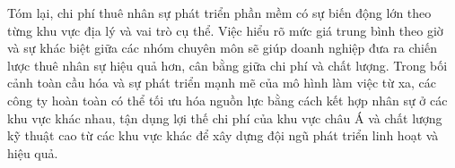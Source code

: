     
      \hspace*{0.8cm}Tóm lại, chi phí thuê nhân sự phát triển phần mềm có sự biến động lớn theo từng khu vực địa lý và vai trò cụ thể. Việc hiểu rõ mức giá trung bình theo giờ và sự khác biệt giữa các nhóm chuyên môn sẽ giúp doanh nghiệp đưa ra chiến lược thuê nhân sự hiệu quả hơn, cân bằng giữa chi phí và chất lượng. Trong bối cảnh toàn cầu hóa và sự phát triển mạnh mẽ của mô hình làm việc từ xa, các công ty hoàn toàn có thể tối ưu hóa nguồn lực bằng cách kết hợp nhân sự ở các khu vực khác nhau, tận dụng lợi thế chi phí của khu vực châu Á và chất lượng kỹ thuật cao từ các khu vực khác để xây dựng đội ngũ phát triển linh hoạt và hiệu quả.
    \vspace{0.5em}